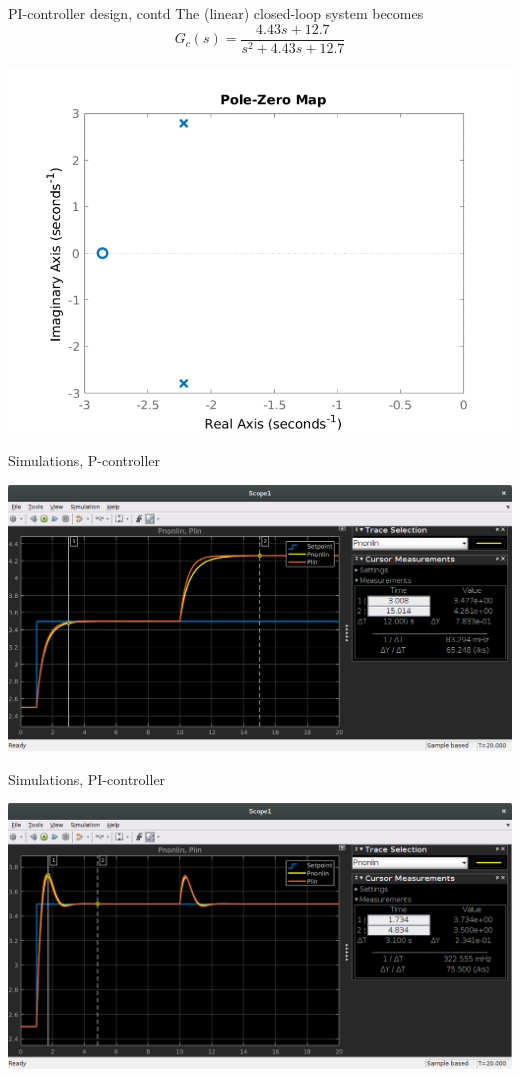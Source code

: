 \documentclass[presentation,aspectratio=169]{beamer}
\begin{document}
\begin{frame}[label={sec:org242b71c}]{PI-controller design, contd}
The (linear) closed-loop system becomes
\[ G_c(s) = \frac{4.43s + 12.7}{s^2 + 4.43s + 12.7}\]

\begin{center}
\includegraphics[width=0.6\linewidth]{../../figures/pzmap_PI_tank.pdf}
\end{center}
\end{frame}

\begin{frame}[label={sec:orgdca5f99}]{Simulations, P-controller}
\begin{center}
\includegraphics[width=1.0\linewidth]{../../figures/sim-P-control-tank.png}
\end{center}
\end{frame}
\begin{frame}[label={sec:org4949533}]{Simulations, PI-controller}
\begin{center}
\includegraphics[width=1.0\linewidth]{../../figures/sim-PI-control-tank.png}
\end{center}
\end{frame}
\end{document}
